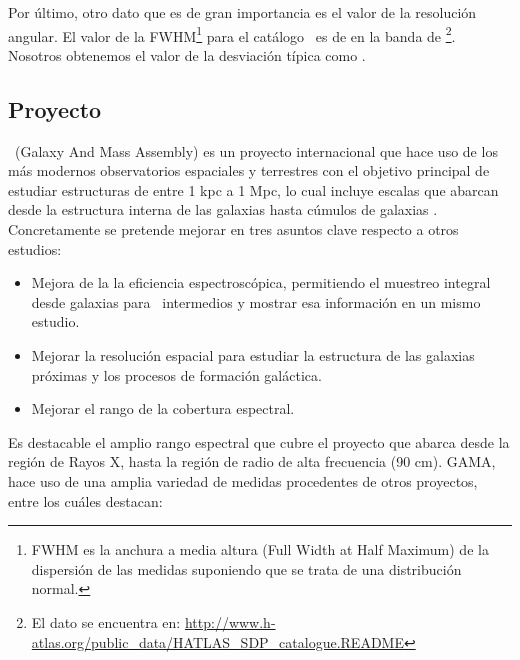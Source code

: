 Por último, otro dato que es de gran importancia es el valor de la resolución angular. El valor de la FWHM\footnote{FWHM es la anchura a media altura (Full Width at Half Maximum) de la dispersión de las medidas suponiendo que se trata de una distribución normal.} para el catálogo \hatlas\ es de  en la banda de \footnote{El dato se encuentra en: \url{http://www.h-atlas.org/public_data/HATLAS_SDP_catalogue.README}}. Nosotros obtenemos el valor de la desviación típica como .

\newpage

\subsection{Proyecto \gama}

\gama\ (Galaxy And Mass Assembly) es un proyecto internacional que hace uso de los más modernos observatorios espaciales y terrestres con el objetivo principal de estudiar estructuras de entre 1 kpc a 1 Mpc, lo cual incluye escalas que abarcan desde la estructura interna de las galaxias hasta cúmulos de galaxias \citep{website:Gama}. Concretamente se pretende mejorar en tres asuntos clave respecto a otros estudios:

\vspace{-3mm}

\begin{itemize}
    \setlength\itemsep{-1mm}
    
    \item Mejora de la la eficiencia espectroscópica, permitiendo el muestreo integral desde galaxias para \rt\ intermedios y mostrar esa información en un mismo estudio.
 
    \item Mejorar la resolución espacial para estudiar la estructura de las galaxias próximas y los procesos de formación galáctica.
 
    \item Mejorar el rango de la cobertura espectral.
 
\end{itemize}

Es destacable el amplio rango espectral que cubre el proyecto que abarca desde la región de Rayos X, hasta la región de radio de alta frecuencia (90 cm).  GAMA, hace uso de una amplia variedad de medidas procedentes de otros proyectos, entre los cuáles destacan:

